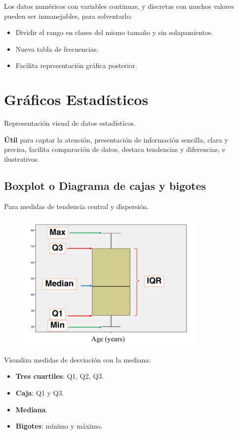 \documentclass[12pt, twoside, openright]{report} %
\begin{document}
Los datos numéricos con variables continuas, y discretas con muchos
valores pueden ser inmanejables, para solventarlo:

\begin{itemize}
	\item Dividir el rango en clases del mismo tamaño y sin solapamientos.
	\item Nueva tabla de frecuencias.
	\item Facilita representación gráfica posterior.
\end{itemize}

\section{Gráficos Estadísticos}

Representación visual de datos estadísticos.

\textbf{Útil} para captar la atención, presentación de información
sencilla, clara y precisa, facilita comparación de datos, destaca
tendencias y diferencias, e ilustrativos.

\subsection{Boxplot o Diagrama de cajas y
	bigotes}

Para medidas de tendencia central y dispersión.

\begin{figure}[H]
	{\includegraphics[scale=.5]{Untitled 4.png}}
\end{figure}

Visualiza medidas de desviación con la mediana:

\begin{itemize}
	\item \textbf{Tres cuartiles}: Q1, Q2, Q3.
	\item \textbf{Caja}: Q1 y Q3.
	\item \textbf{Mediana}.
	\item \textbf{Bigotes}: mínimo y máximo.
\end{itemize}
\end{document}
